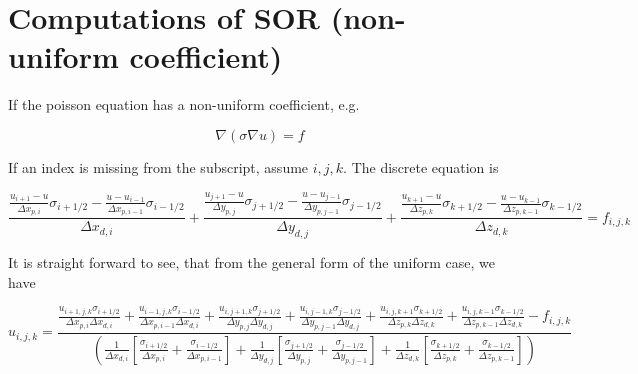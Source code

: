 \documentclass[11pt]{article}
\begin{document}
\section{Computations of SOR (non-uniform coefficient)}

If the poisson equation has a non-uniform coefficient, e.g.

\begin{equation}
	\nabla \left( \sigma \nabla u \right) = f
\end{equation}

If an index is missing from the subscript, assume $i,j,k$. The discrete equation is

\begin{equation}
	\frac{\frac{u_{i+1}-u}{\Delta x_{p,i}} \sigma_{i+1/2} - \frac{u-u_{i-1}}{\Delta x_{p,i-1}} \sigma_{i-1/2}}{\Delta x_{d,i}} + 
	\frac{\frac{u_{j+1}-u}{\Delta y_{p,j}} \sigma_{j+1/2} - \frac{u-u_{j-1}}{\Delta y_{p,j-1}} \sigma_{j-1/2}}{\Delta y_{d,j}} +
	\frac{\frac{u_{k+1}-u}{\Delta z_{p,k}} \sigma_{k+1/2} - \frac{u-u_{k-1}}{\Delta z_{p,k-1}} \sigma_{k-1/2}}{\Delta z_{d,k}} = f_{i,j,k}
\end{equation}

It is straight forward to see, that from the general form of the uniform case, we have


\begin{equation}
	u_{i,j,k} = 
	\frac{ 
	\frac{u_{i+1,j,k} \sigma_{i+1/2}}{\Delta x_{p,i} \Delta x_{d,i}} + \frac{u_{i-1,j,k}\sigma_{i-1/2}}{\Delta x_{p,i-1} \Delta x_{d,i}} + 
	\frac{u_{i,j+1,k} \sigma_{j+1/2}}{\Delta y_{p,j} \Delta y_{d,j}} + \frac{u_{i,j-1,k}\sigma_{j-1/2}}{\Delta y_{p,j-1} \Delta y_{d,j}} +
	\frac{u_{i,j,k+1} \sigma_{k+1/2}}{\Delta z_{p,k} \Delta z_{d,k}} + \frac{u_{i,j,k-1}\sigma_{k-1/2}}{\Delta z_{p,k-1} \Delta z_{d,k}}
	- f_{i,j,k} }{
	\left( 
	\frac{ 1 }{ \Delta x_{d,i} }
	\left[
	\frac{ \sigma_{i+1/2} }{ \Delta x_{p,i} } +
	\frac{ \sigma_{i-1/2} }{ \Delta x_{p,i-1} }
	\right] +
	\frac{ 1 }{ \Delta y_{d,j} }
	\left[
	\frac{ \sigma_{j+1/2} }{ \Delta y_{p,j} } +
	\frac{ \sigma_{j-1/2} }{ \Delta y_{p,j-1} }
	\right] +
	\frac{ 1 }{ \Delta z_{d,k} }
	\left[
	\frac{ \sigma_{k+1/2} }{ \Delta z_{p,k} } +
	\frac{ \sigma_{k-1/2} }{ \Delta z_{p,k-1} }
	\right]
	\right)
	}
\end{equation}
\end{document}
